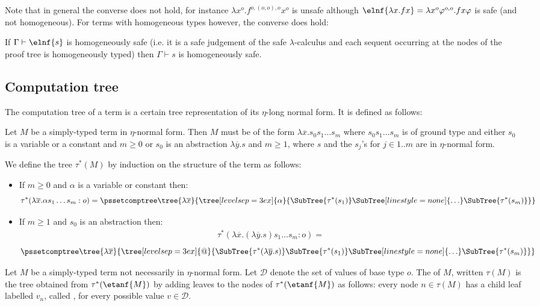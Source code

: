 Note that in general the converse does not hold, for instance $\lambda x^o . f^{o,(o,o),o} x^o$ is unsafe although $\elnf{\lambda x . f x} = \lambda x^o \varphi^{o,o} . f x \varphi$ is safe (and not homogeneous). For terms with homogeneous types however, the converse does hold:
\begin{lemma}
If $\Gamma \vdash \elnf{s}$ is homogeneously safe (i.e. it is a safe judgement of the safe $\lambda$-calculus and each sequent occurring at the nodes of the proof tree is homogeneously typed) then
$\Gamma \vdash s$ is homogeneously safe.
\end{lemma}


\subsection{Computation tree}
The computation tree of a term is a certain tree representation of its
$\eta$-long normal form. It is defined as follows:

\begin{definition}
\label{dfn:comptree} Let $M$ be a simply-typed term in $\eta$-normal
form. Then $M$ must be of the form $\lambda \overline{x} . s_0 s_1
\ldots s_m$ where $s_0 s_1 \ldots s_m$ is of ground type and either
$s_0$ is a variable or a constant and $m\geq0$ or $s_0$ is an
abstraction $\lambda\overline{y}.s$ and $m\geq1$, where $s$ and the
$s_j$'s for $j\in 1..m$ are in $\eta$-normal form.

We define the tree $\tau^*(M)$ by induction on the structure of the
term as follows:
\begin{itemize}[-]
\item If $m\geq0$ and $\alpha$ is a variable or constant then:
$$ \tau^*( \lambda\overline{x} . \alpha s_1 \ldots s_m : o) =
    \pssetcomptree
    \tree{\lambda\overline{x}}
    {
        \tree[levelsep=3ex]{ \alpha }
            { \SubTree{\tau^*(s_1)} \SubTree[linestyle=none]{\ldots} \SubTree{\tau^*(s_m)}
            }
    }
$$

\item If $m \geq 1$ and $s_0$ is an abstraction then:
\begin{align*}
 \tau^*(\lambda\overline{x} . (\lambda\overline{y}.s) s_1 \ldots s_m : o)=
\end{align*}
$$\pssetcomptree\tree{\lambda\overline{x}} { \tree[levelsep=3ex]{
        @ } { \SubTree{\tau^*(\lambda\overline{y}.s)}
            \SubTree{\tau^*(s_1)}
            \SubTree[linestyle=none]{\ldots}
            \SubTree{\tau^*(s_m)} }}$$
\end{itemize}

Let $M$ be a simply-typed term not necessarily in $\eta$-normal
form. Let $\mathcal{D}$ denote the set of values of base type $o$.
The  of $M$, written $\tau(M)$ is the tree
obtained from $\tau^*(\etanf{M})$ by adding leaves to the nodes of
$\tau^*(\etanf{M})$ as follows: every node $n \in \tau(M)$ has a
child leaf labelled $v_n$, called , for every
possible value $v \in \mathcal{D}$.
\end{definition}


